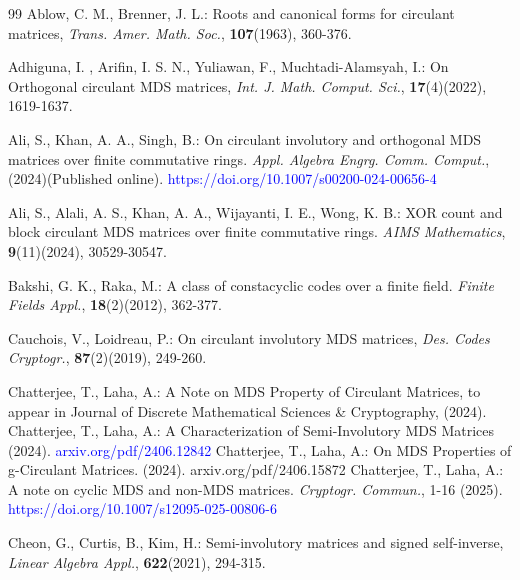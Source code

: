 \documentclass[12pt]{article}
\begin{document}
\begin{thebibliography}{99}
	   Ablow, C. M.,  Brenner, J. L.: Roots and canonical forms for circulant matrices, \textit{Trans. Amer. Math. Soc.},  \textbf{107}(1963),  360-376.
	
	  Adhiguna, I. , Arifin, I. S. N., Yuliawan, F., Muchtadi-Alamsyah, I.: On
Orthogonal circulant MDS matrices, \textit{Int. J. Math. Comput. Sci.},  \textbf{17}(4)(2022), 1619-1637.

Ali, S., Khan, A. A., Singh, B.: On circulant involutory and orthogonal MDS matrices over finite commutative rings. \textit{Appl. Algebra Engrg. Comm. Comput.}, (2024)(Published online). \textcolor{blue}{https://doi.org/10.1007/s00200-024-00656-4}

 Ali, S., Alali, A. S., Khan, A. A., Wijayanti, I. E.,  Wong, K. B.:  XOR count and block circulant MDS matrices over finite commutative rings. \textit{AIMS Mathematics}, \textbf{9}(11)(2024), 30529-30547.


Bakshi, G. K.,  Raka, M.: A class of constacyclic codes over a finite field. \textit{Finite Fields  Appl.}, \textbf{18}(2)(2012), 362-377.

 Cauchois, V., Loidreau, P.: On circulant involutory MDS matrices, \textit{Des. Codes Cryptogr.}, \textbf{87}(2)(2019), 249-260.


 Chatterjee, T., Laha, A.: A Note on MDS Property of Circulant Matrices, to appear in Journal of Discrete
Mathematical Sciences \& Cryptography, (2024).
 Chatterjee, T., Laha, A.: A Characterization of Semi-Involutory MDS Matrices (2024).
\textcolor{blue}{arxiv.org/pdf/2406.12842}
 Chatterjee, T., Laha, A.: On MDS Properties of g-Circulant Matrices. (2024). arxiv.org/pdf/2406.15872
  Chatterjee, T.,  Laha, A.: A note on cyclic MDS and non-MDS matrices. \textit{Cryptogr. Commun.}, 1-16 (2025). \textcolor{blue}{https://doi.org/10.1007/s12095-025-00806-6}











   Cheon, G., Curtis, B., Kim, H.: Semi-involutory matrices and signed self-inverse,\textit{ Linear
Algebra Appl.}, \textbf{622}(2021), 294-315.


\end{thebibliography}
\end{document}
